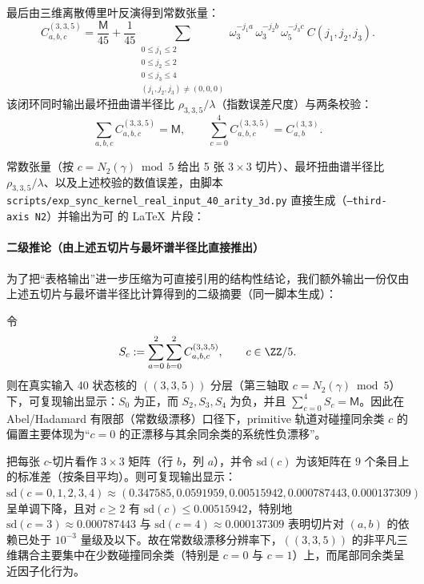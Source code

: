 最后由三维离散傅里叶反演得到常数张量：
$$
C^{(3,3,5)}_{a,b,c}
=\frac{\mathsf{M}}{45}
+\frac{1}{45}\!\!\!\sum_{\substack{0\le j_1\le 2\\0\le j_2\le 2\\0\le j_3\le 4\\(j_1,j_2,j_3)\ne(0,0,0)}}
\omega_3^{-j_1 a}\,\omega_3^{-j_2 b}\,\omega_5^{-j_3 c}\ C(j_1,j_2,j_3).
$$
该闭环同时输出最坏扭曲谱半径比 $\rho_{3,3,5}/\lambda$（指数误差尺度）与两条校验：
$$
\sum_{a,b,c}C^{(3,3,5)}_{a,b,c}=\mathsf{M},
\qquad
\sum_{c=0}^{4}C^{(3,3,5)}_{a,b,c}=C^{(3,3)}_{a,b}.
$$

常数张量（按 $c=N_2(\gamma)\bmod 5$ 给出 5 张 $3\times 3$ 切片）、最坏扭曲谱半径比 $\rho_{3,3,5}/\lambda$、以及上述校验的数值误差，由脚本
\texttt{scripts/exp\_sync\_kernel\_real\_input\_40\_arity\_3d.py}
直接生成（\texttt{--third-axis N2}）并输出为可 \verb|| 的 \LaTeX\ 片段：


\paragraph{二级推论（由上述五切片与最坏谱半径比直接推出）}
为了把“表格输出”进一步压缩为可直接引用的结构性结论，我们额外输出一份仅由上述五切片与最坏谱半径比计算得到的二级摘要（同一脚本生成）：


\begin{corollary}\label{cor:arity-335-collision-residue-drift}
令
\[
S_c:=\sum_{a=0}^{2}\sum_{b=0}^{2}C^{(3,3,5)}_{a,b,c},
\qquad c\in\ZZ/5.
\]
则在真实输入 40 状态核的 \(((3,3,5))\) 分层（第三轴取 $c=N_2(\gamma)\bmod 5$）下，可复现输出显示：$S_0$ 为正，而 $S_2,S_3,S_4$ 为负，并且 $\sum_{c=0}^4 S_c=\mathsf{M}$。因此在 Abel/Hadamard 有限部（常数级漂移）口径下，primitive 轨道对碰撞同余类 $c$ 的偏置主要体现为“$c=0$ 的正漂移与其余同余类的系统性负漂移”。
\end{corollary}

\begin{corollary}\label{cor:arity-335-localized-ab-coupling}
把每张 $c$-切片看作 $3\times 3$ 矩阵（行 $b$，列 $a$），并令 $\mathrm{sd}(c)$ 为该矩阵在 $9$ 个条目上的标准差（按条目平均）。则可复现输出显示：$\mathrm{sd}(c=0,1,2,3,4)\approx(0.347585,0.0591959,0.00515942,0.000787443,0.000137309)$ 呈单调下降，且对 $c\ge 2$ 有 $\mathrm{sd}(c)\le 0.00515942$，特别地 $\mathrm{sd}(c=3)\approx 0.000787443$ 与 $\mathrm{sd}(c=4)\approx 0.000137309$ 表明切片对 $(a,b)$ 的依赖已处于 $10^{-3}$ 量级及以下。故在常数级漂移分辨率下，\(((3,3,5))\) 的非平凡三维耦合主要集中在少数碰撞同余类（特别是 $c=0$ 与 $c=1$）上，而尾部同余类呈近因子化行为。
\end{corollary}

